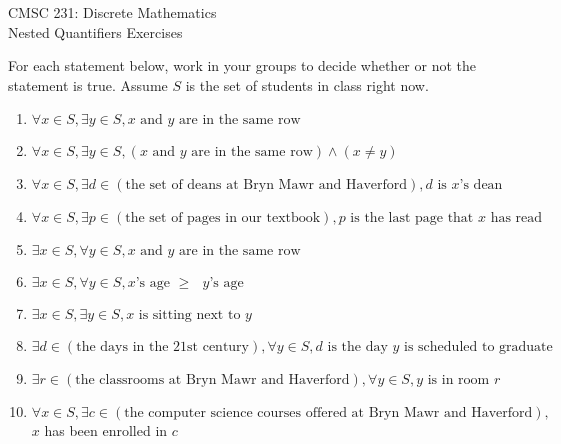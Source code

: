 \documentclass{article}
\begin{document}
\begin{center}
CMSC 231: Discrete Mathematics\\
Nested Quantifiers Exercises
\end{center}

For each statement below, work in your groups to decide whether or not the
statement is true.
Assume $S$ is the set of students in class right now.

\begin{enumerate}[itemsep=2ex]
\item $\forall x \in S, \exists y \in S, \text{$x$ and $y$ are in the same row}$

\item $\forall x \in S, \exists y \in S, (\text{$x$ and $y$ are in the same row}) \wedge (x \neq y)$

\item $\forall x \in S, \exists d \in (\text{the set of deans at Bryn Mawr and Haverford}), \text{$d$ is $x$'s dean}$

\item $\forall x \in S, \exists p \in (\text{the set of pages in our textbook}), \text{$p$ is the last page that $x$ has read}$

\item $\exists x \in S, \forall y \in S, \text{$x$ and $y$ are in the same row}$

\item $\exists x \in S, \forall y \in S, \text{$x$'s age $\geq$ $y$'s age}$

\item $\exists x \in S, \exists y \in S, \text{$x$ is sitting next to $y$}$

\item $\exists d \in (\text{the days in the 21st century}), \forall y \in S, \text{$d$ is the day $y$ is scheduled to graduate}$

\item $\exists r \in (\text{the classrooms at Bryn Mawr and Haverford}), \forall y \in S, \text{$y$ is in room $r$}$

\item $\forall x \in S, \exists c \in (\text{the computer science courses offered at Bryn Mawr and Haverford}),$ $x$ has been enrolled in $c$

\end{enumerate}
\end{document}
